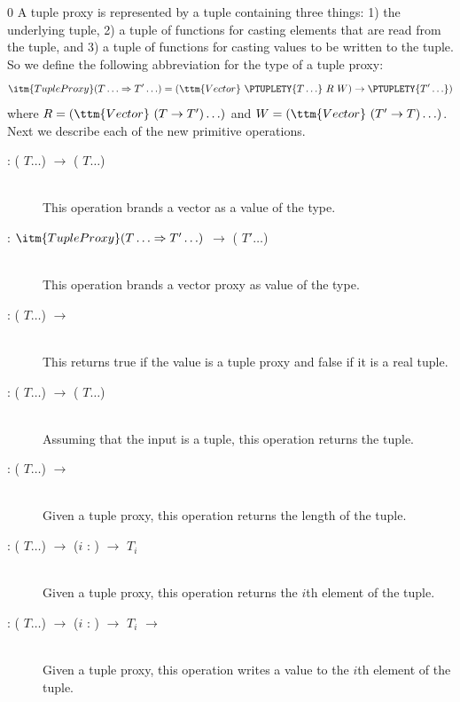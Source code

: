 \documentclass[7x10]{TimesAPriori_MIT}%
\def\racketEd{0}
\def\edition{0}
\numberwithin{theorem}{chapter}
\numberwithin{definition}{chapter}
\numberwithin{equation}{chapter}
\begin{document}
{\if\edition\racketEd    
A tuple proxy is represented by a tuple containing three things: 1) the
underlying tuple, 2) a tuple of functions for casting elements that
are read from the tuple, and 3) a tuple of functions for casting
values to be written to the tuple. So we define the following
abbreviation for the type of a tuple proxy:
\[
\itm{TupleProxy} (T\ldots \Rightarrow T'\ldots)
= (\ttm{Vector}~\PTUPLETY{T\ldots} ~R~ W) \to \PTUPLETY{T' \ldots})
\]
where $R = (\ttm{Vector}~(T\to T') \ldots)$ and
$W = (\ttm{Vector}~(T'\to T) \ldots)$.
%
Next we describe each of the new primitive operations.

\begin{description}
\item[ : ( $T \ldots$) $\to$
  ( $T \ldots$)]\ \\
%
  This operation brands a vector as a value of the  type.
\item[ : $\itm{TupleProxy}(T\ldots \Rightarrow T'\ldots)$
  $\to$ ( $T' \ldots$)]\ \\
%
  This operation brands a vector proxy as value of the  type.
\item[ : ( $T \ldots$) $\to$
  \BOOLTY{}] \ \\
%
  This returns true if the value is a tuple proxy and false if it is a
  real tuple.
\item[ : ( $T \ldots$) $\to$
  ( $T \ldots$)]\ \\
%
  Assuming that the input is a tuple, this operation returns the
  tuple.
  
\item[ : ( $T \ldots$)
  $\to$ \BOOLTY{}]\ \\
%
  Given a tuple proxy, this operation returns the length of the tuple.
  
\item[ : ( $T \ldots$)
  $\to$ ($i$ : ) $\to$ $T_i$]\ \\
%
  Given a tuple proxy, this operation returns the $i$th element of the
  tuple.
  
\item[ : ( $T \ldots$) $\to$ ($i$
  : ) $\to$ $T_i$ $\to$ ]\ \\
  Given a tuple proxy, this operation writes a value to the $i$th element
  of the tuple.
\end{description}
\fi}
\end{document}
